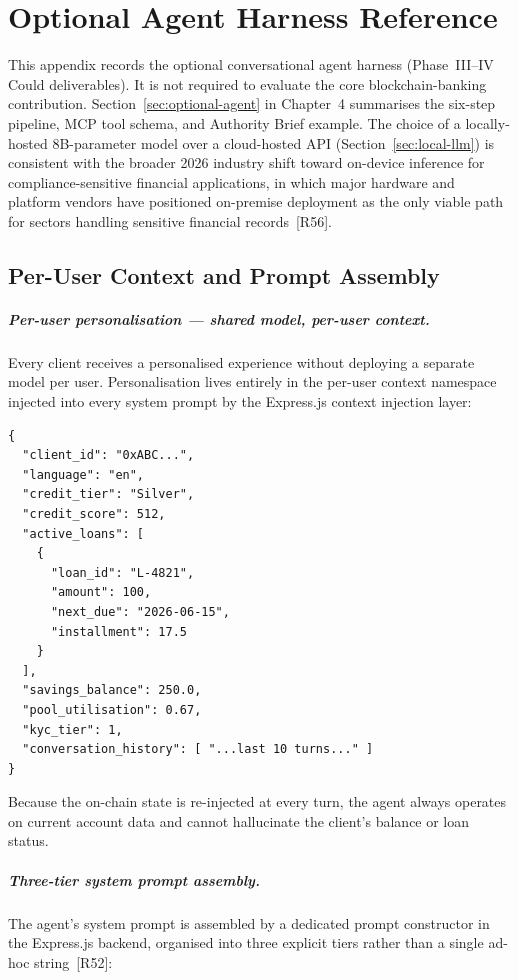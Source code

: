 \documentclass[12pt,a4paper]{report}
\begin{document}
\chapter{Optional Agent Harness Reference}
\label{app:agent-harness}

This appendix records the optional conversational agent harness (Phase~III--IV Could deliverables). It is not required to evaluate the core blockchain-banking contribution. Section~\ref{sec:optional-agent} in Chapter~4 summarises the six-step pipeline, MCP tool schema, and Authority Brief example.
The choice of a locally-hosted 8B-parameter model over a cloud-hosted
API (Section~\ref{sec:local-llm}) is consistent with the broader 2026
industry shift toward on-device inference for compliance-sensitive
financial applications, in which major hardware and platform vendors
have positioned on-premise deployment as the only viable path for
sectors handling sensitive financial records~[R56].

\section{Per-User Context and Prompt Assembly}

\paragraph{Per-user personalisation --- shared model, per-user context.}
Every client receives a personalised experience without deploying a separate model per user. Personalisation lives entirely in the per-user context namespace injected into every system prompt by the Express.js context injection layer:

\begin{verbatim}
{
  "client_id": "0xABC...",
  "language": "en",
  "credit_tier": "Silver",
  "credit_score": 512,
  "active_loans": [
    {
      "loan_id": "L-4821",
      "amount": 100,
      "next_due": "2026-06-15",
      "installment": 17.5
    }
  ],
  "savings_balance": 250.0,
  "pool_utilisation": 0.67,
  "kyc_tier": 1,
  "conversation_history": [ "...last 10 turns..." ]
}
\end{verbatim}

\noindent Because the on-chain state is re-injected at every turn, the agent always operates on current account data and cannot hallucinate the client's balance or loan status.

\paragraph{Three-tier system prompt assembly.}
The agent's system prompt is assembled by a dedicated prompt constructor in the Express.js backend, organised into three explicit tiers rather than a single ad-hoc string~[R52]:
\end{document}
